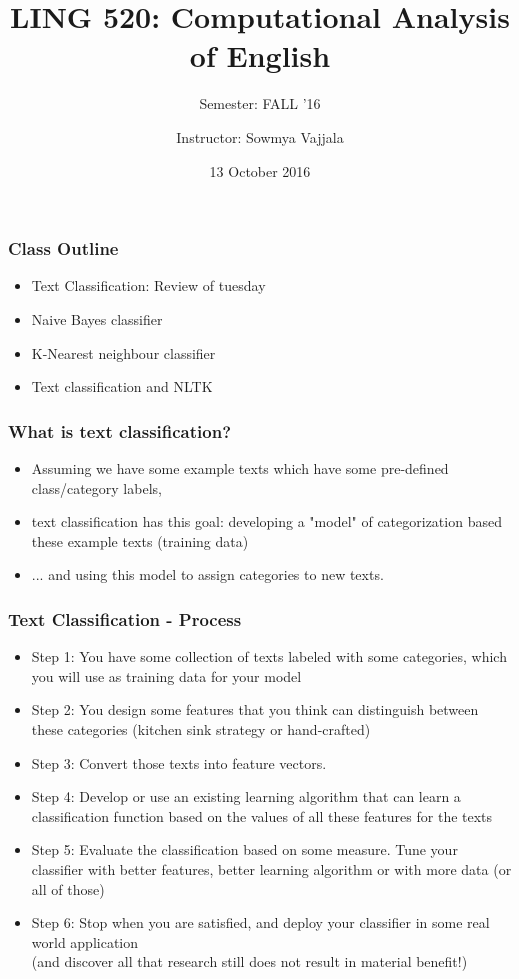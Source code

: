 \documentclass{beamer}
\author[Sowmya Vajjala]{Instructor: Sowmya Vajjala}
\title[LING 520]{LING 520: Computational Analysis of English}
\subtitle{Semester: FALL '16}
\date{13 October 2016}
\institute{Iowa State University, USA}
\begin{document}
\begin{frame}\titlepage
\end{frame}

\begin{frame}
\frametitle{Class Outline}
\begin{itemize}
\item Text Classification: Review of tuesday
\item Naive Bayes classifier
\item K-Nearest neighbour classifier
\item Text classification and NLTK
\end{itemize}
\end{frame}

\begin{frame}
\frametitle{What is text classification?}
\begin{itemize}
\item Assuming we have some example texts which have some pre-defined class/category labels,
\item text classification has this goal: developing a "model" of categorization based these example texts (training data)
\item ... and using this model to assign categories to new texts.
\end{itemize}
\end{frame}

\begin{frame}
\frametitle{Text Classification - Process}
\begin{itemize}
\item Step 1: You have some collection of texts labeled with some categories, which you will use as training data for your model \pause
\item Step 2: You design some features that you think can distinguish between these categories (kitchen sink strategy or hand-crafted) \pause
\item Step 3: Convert those texts into feature vectors. \pause
\item Step 4: Develop or use an existing learning algorithm that can learn a classification function based on the values of all these features for the texts \pause
\item Step 5: Evaluate the classification based on some measure. Tune your classifier with better features, better learning algorithm or with more data (or all of those) \pause
\item Step 6: Stop when you are satisfied, and deploy your classifier in some real world application \pause \\ (and discover all that research still does not result in material benefit!)
\end{itemize}
\end{frame}
\end{document}
